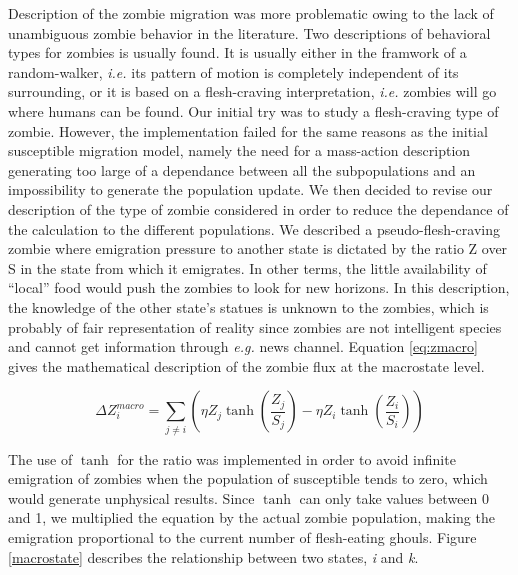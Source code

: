 \documentclass[11pt]{article} %
\begin{document}
Description of the zombie migration was more problematic owing to the lack of unambiguous zombie behavior in the literature. Two descriptions of behavioral types for zombies is usually found. It is usually either in the framwork of a random-walker, \textit{i.e.} its pattern of motion is completely independent of its surrounding, or it is based on a flesh-craving interpretation, \textit{i.e.} zombies will go where humans can be found. Our initial try was to study a flesh-craving type of zombie. However, the implementation failed for the same reasons as the initial susceptible migration model, namely the need for a mass-action description generating too large of a dependance between all the subpopulations and an impossibility to generate the population update. We then decided to revise our description of the type of zombie considered in order to reduce the dependance of the calculation to the different populations. We described a pseudo-flesh-craving zombie where emigration pressure to another state is dictated by the ratio Z over S in the state from which it emigrates. In other terms, the little availability of ``local'' food would push the zombies to look for new horizons. In this description, the knowledge of the other state's statues is unknown to the zombies, which is probably of fair representation of reality since zombies are not intelligent species and cannot get information through \textit{e.g.} news channel. Equation \eqref{eq:zmacro} gives the mathematical description of the zombie flux at the macrostate level. 

\bigskip
\begin{equation} \label{eq:zmacro}
\Delta Z_{i}^{macro} = \sum_{j\neq i}{\left( \eta Z_{j}\tanh \left( \frac{Z_{j}}{S_{j}}\right) -\eta Z_{i}\tanh \left( \frac{Z_{i}}{S_{i}}\right) \right)}
\end{equation}
\bigskip

The use of $\tanh$ for the ratio was implemented in order to avoid infinite emigration of zombies when the population of susceptible tends to zero, which would generate unphysical results. Since $\tanh$ can only take values between 0 and 1, we multiplied the equation by the actual zombie population, making the emigration proportional to the current number of flesh-eating ghouls. Figure \ref{macrostate} describes the relationship between two states, \textit{i} and \textit{k}.
\end{document}
